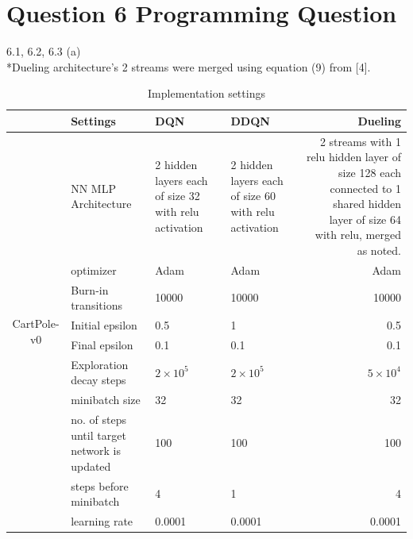 \documentclass[12pt]{article}
\begin{document}
\section*{Question 6 Programming Question}
    \begin{tcolorbox}[fit,height=22cm, width=\textwidth, blank, borderline={1pt}{-2pt},nobeforeafter]
    {\large 6.1, 6.2, 6.3 (a)}\\
    *Dueling architecture's 2 streams were merged using equation (9) from [4].
	\begin{table}[H]
		\centering
		\caption{Implementation settings}
		\begin{tabular}{|c|p{7.785em}|l|l|r|}
			\cline{2-5}    \multicolumn{1}{r|}{} & Settings & \multicolumn{1}{p{7.93em}|}{DQN} & \multicolumn{1}{p{7.93em}|}{DDQN} & \multicolumn{1}{p{7.5em}|}{Dueling} \\
			\hline
			\multirow{10}[20]{*}{\begin{sideways}CartPole-v0\end{sideways}} & NN MLP Architecture  & \multicolumn{1}{p{7.93em}|}{2 hidden layers each of size 32 with relu activation} & \multicolumn{1}{p{7.93em}|}{2 hidden layers each of size 60 with relu activation} & \multicolumn{1}{p{7.93em}|}{\footnotesize 2 streams with 1 relu hidden layer of size 128 each connected to 1 shared hidden layer of size 64 with relu, merged as noted.} \\
			\cline{2-5}          & optimizer & \multicolumn{1}{p{7.93em}|}{Adam} & \multicolumn{1}{p{7.93em}|}{Adam} & \multicolumn{1}{p{7.93em}|}{Adam} \\
			\cline{2-5}          & {\footnotesize Burn-in transitions} & 10000 & 10000 &  10000 \\
			\cline{2-5}          & Initial epsilon & 0.5   & 1     & 0.5 \\
			\cline{2-5}          & Final epsilon & 0.1   & 0.1   & 0.1 \\
			\cline{2-5}          & Exploration decay steps & \multicolumn{1}{p{7.93em}|}{$2\times10^5$} & \multicolumn{1}{p{7.93em}|}{$2\times10^5$} & \multicolumn{1}{p{7.93em}|}{$5\times10^4$} \\
			\cline{2-5}          & minibatch size & 32    & 32    & 32  \\
			\cline{2-5}          & {\footnotesize no. of steps until target network is updated} & 100   & 100   & 100  \\
			\cline{2-5}          & steps before minibatch & 4     & 1     & 4 \\
			\cline{2-5}          & learning rate & 0.0001 & 0.0001 &  0.0001 \\

\end{tabular}
\end{table}
\end{tcolorbox}
\end{document}
